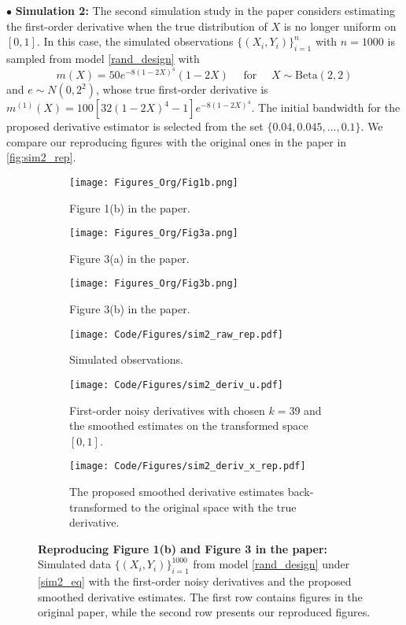 \documentclass{uwstat572}
\theoremstyle{definition}
\theoremstyle{theorem}
\begin{document}
$\bullet$ {\bf Simulation 2:} The second simulation study in the paper \citep{liu2020smoothed} considers estimating the first-order derivative when the true distribution of $X$ is no longer uniform on $[0,1]$. In this case, the simulated observations $\{(X_i,Y_i)\}_{i=1}^n$ with $n=1000$ is sampled from model \eqref{rand_design} with
\begin{equation}
\label{sim2_eq}
m(X) = 50e^{-8(1-2X)^4} (1-2X)\quad \text{ for } \quad X\sim \mathrm{Beta}(2,2)
\end{equation}
and $e\sim N(0,2^2)$, whose true first-order derivative is $m^{(1)}(X) = 100\left[32(1-2X)^4 -1\right] e^{-8(1-2X)^4}$. The initial bandwidth for the proposed derivative estimator is selected from the set $\{0.04, 0.045,...,0.1\}$. We compare our reproducing figures with the original ones in the paper in \autoref{fig:sim2_rep}.

\begin{figure}[t]
	\captionsetup[subfigure]{justification=centering}
	\begin{subfigure}[t]{0.32\linewidth}
		\centering
		\texttt{[image: Figures\_Org/Fig1b.png]}
		\caption{Figure 1(b) in the paper.}
	\end{subfigure}
	\hfil
	\begin{subfigure}[t]{0.32\linewidth}
		\centering
		\texttt{[image: Figures\_Org/Fig3a.png]}
		\caption{Figure 3(a) in the paper.}
	\end{subfigure}
	\hfil
	\begin{subfigure}[t]{0.32\linewidth}
		\centering
		\texttt{[image: Figures\_Org/Fig3b.png]}
		\caption{Figure 3(b) in the paper.}
	\end{subfigure}
	\begin{subfigure}[t]{0.32\linewidth}
		\centering
		\texttt{[image: Code/Figures/sim2\_raw\_rep.pdf]}
		\caption{Simulated observations.}
	\end{subfigure}
	\hfil
	\begin{subfigure}[t]{0.32\linewidth}
		\centering
		\texttt{[image: Code/Figures/sim2\_deriv\_u.pdf]}
		\caption{First-order noisy derivatives with chosen $k=39$ and the smoothed estimates on the transformed space $[0,1]$.}
	\end{subfigure}
	\hfil
	\begin{subfigure}[t]{0.32\linewidth}
		\centering
		\texttt{[image: Code/Figures/sim2\_deriv\_x\_rep.pdf]}
		\caption{The proposed smoothed derivative estimates back-transformed to the original space with the true derivative.}
	\end{subfigure}
	\caption{{\bf Reproducing Figure 1(b) and Figure 3 in the paper:} Simulated data $\{(X_i,Y_i)\}_{i=1}^{1000}$ from model \eqref{rand_design} under \eqref{sim2_eq} with the first-order noisy derivatives and the proposed smoothed derivative estimates. The first row contains figures in the original paper, while the second row presents our reproduced figures.}
	\label{fig:sim2_rep}
\end{figure}
\end{document}

